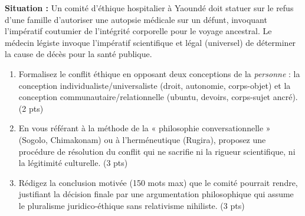 \documentclass[11pt]{article}
\begin{document}
\begin{exercice}
\textbf{Situation :} Un comité d'éthique hospitalier à Yaoundé doit statuer sur le refus d'une famille d'autoriser une autopsie médicale sur un défunt, invoquant l'impératif coutumier de l'intégrité corporelle pour le voyage ancestral. Le médecin légiste invoque l'impératif scientifique et légal (universel) de déterminer la cause de décès pour la santé publique.

\begin{enumerate}
    \item Formalisez le conflit éthique en opposant deux conceptions de la \textit{personne} : la conception individualiste/universaliste (droit, autonomie, corps-objet) et la conception communautaire/relationnelle (ubuntu, devoirs, corps-sujet ancré). (2 pts)
    \item En vous référant à la méthode de la « philosophie conversationnelle » (Sogolo, Chimakonam) ou à l'herméneutique (Rugira), proposez une procédure de résolution du conflit qui ne sacrifie ni la rigueur scientifique, ni la légitimité culturelle. (3 pts)
    \item Rédigez la conclusion motivée (150 mots max) que le comité pourrait rendre, justifiant la décision finale par une argumentation philosophique qui assume le pluralisme juridico-éthique sans relativisme nihiliste. (3 pts)
\end{enumerate}
\end{exercice}
\end{document}
